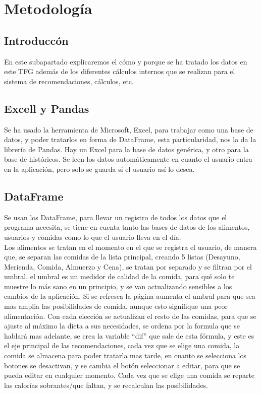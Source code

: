\section{Metodología}
\subsection{Introduccón}
En este subapartado explicaremos el cómo y porque se ha tratado los datos en este TFG además de los diferentes cálculos internos que se realizan para el sistema de recomendaciones, cálculos, etc.
\subsection{Excell y Pandas}
Se ha usado la herramienta de Microsoft, Excel, para trabajar como una base de datos, y poder tratarlos en forma de DataFrame, esta particularidad, nos la da la librería de Pandas. Hay un Excel para la base de datos genérica, y otro para la base de históricos. Se leen los datos automáticamente en cuanto el usuario entra en la aplicación, pero solo se guarda si el usuario así lo desea.
\subsection{DataFrame}
Se usan los DataFrame, para llevar un registro de todos los datos que el programa necesita, se tiene en cuenta tanto las bases de datos de los alimentos, usuarios y comidas como lo que el usuario lleva en el día.
\\
Los alimentos se tratan en el momento en el que se registra el usuario, de manera que, se separan las comidas de la lista principal, creando 5 listas (Desayuno, Merienda, Comida, Almuerzo y Cena), se tratan por separado y se filtran por el umbral, el umbral es un medidor de calidad de la comida, para qué solo te muestre lo más sano en un principio, y se van actualizando sensibles a los cambios de la aplicación. Si se refresca la página aumenta el umbral para que sea mas amplia las posibilidades de comida, aunque esto signifique una peor alimentación. Con cada elección se actualizan el resto de las comidas, para que se ajuste al máximo la dieta a sus necesidades, se ordena por la formula que se hablará mas adelante, se crea la variable “dif” que sale de esta fórmula, y este es el eje principal de las recomendaciones, cada vez que se elige una comida, la comida se almacena para poder tratarla mas tarde, en cuanto se selecciona los botones se desactivan, y se cambia el botón seleccionar a editar, para que se pueda editar en cualquier momento. Cada vez que se elige una comida se reparte las calorías sobrantes/que faltan, y se recalculan las posibilidades.

